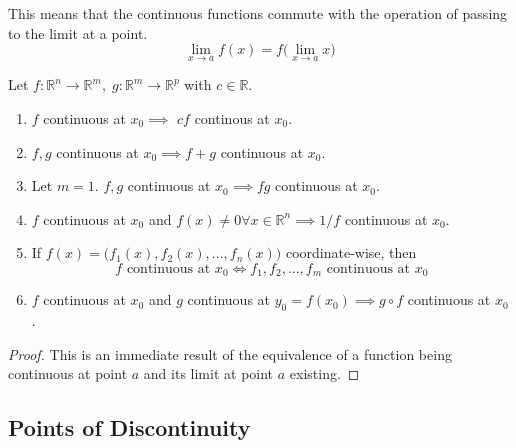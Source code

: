 \documentclass{article}
\begin{document}
    \begin{theorem}
    This means that the continuous functions commute with the operation of passing to the limit at a point. 
    \[\lim_{x \rightarrow a} f(x) = f\Big( \lim_{x \rightarrow a} x \Big)\]
    \end{theorem}

    \begin{lemma}
      Let $f: \mathbb{R}^n \longrightarrow \mathbb{R}^m, \; g: \mathbb{R}^m \longrightarrow \mathbb{R}^p$ with $c \in \mathbb{R}$. 
      \begin{enumerate}
        \item $f$ continuous at $x_0 \implies$ $c f$ continous at $x_0$. 
        \item $f, g$ continuous at $x_0 \implies f + g$ continuous at $x_0$. 
        \item Let $m = 1$. $f, g$ continuous at $x_0 \implies f g$ continuous at $x_0$. 
        \item $f$ continuous at $x_0$ and $f(x) \neq 0 \forall x \in \mathbb{R}^n \implies 1 / f$ continuous at $x_0$. 
        \item If $f(x) = \big( f_1(x), f_2(x), ..., f_n(x) \big)$ coordinate-wise, then 
      \[ f \text{ continuous at } x_0 \iff f_1, f_2, ..., f_m \text{ continuous  at } x_0\]
          \item $f$ continuous at $x_0$ and $g$ continuous at $y_0 = f(x_0) \implies g \circ f$ continuous at $x_0$. 
      \end{enumerate}
    \end{lemma}
    \begin{proof}
    This is an immediate result of the equivalence of a function being continuous at point $a$ and its limit at point $a$ existing. 
    \end{proof}

  \subsection{Points of Discontinuity}
\end{document}

